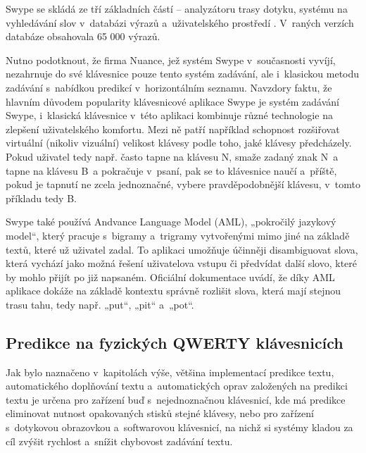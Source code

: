 \documentclass[a4paper,11pt,openany]{book} %
\begin{document}
Swype se skládá ze tří základních částí -- analyzátoru trasy dotyku, systému na vyhledávání slov v~databázi výrazů a~uživatelského prostředí \parencite{kushler2006system}. V~raných verzích databáze obsahovala 65 000 výrazů. \parencite{rafeneedleman2008} %

Nutno podotknout, že firma Nuance, jež systém Swype v~současnosti vyvíjí, nezahrnuje do své klávesnice pouze tento systém zadávání, ale i~klasickou metodu zadávání s~nabídkou predikcí v~horizontálním seznamu. Navzdory faktu, že hlavním důvodem popularity klávesnicové aplikace Swype je systém zadávání Swype, i~klasická klávesnice v~této aplikaci kombinuje různé technologie na zlepšení uživatelského komfortu. Mezi ně patří například schopnost rozšiřovat virtuální (nikoliv vizuální) velikost klávesy podle toho, jaké klávesy předcházely. Pokud uživatel tedy např. často tapne na klávesu N, smaže zadaný znak N~a tapne na klávesu B~a pokračuje v~psaní, pak se to klávesnice naučí a~příště, pokud je tapnutí ne zcela jednoznačné, vybere pravděpodobnější klávesu, v~tomto příkladu tedy B. \parencite{swypeabout} %


Swype také používá Andvance Language Model (AML), „pokročilý jazykový model“, který pracuje s~bigramy a~trigramy vytvořenými mimo jiné na základě textů, které už uživatel zadal. To aplikaci umožňuje účinněji disambiguovat slova, která vychází jako možná řešení uživatelova vstupu či předvídat další slovo, které by mohlo přijít po již napsaném. Oficiální dokumentace uvádí, že díky AML aplikace dokáže na základě kontextu správně rozlišit slova, která mají stejnou trasu tahu, tedy např. „put“, „pit“ a~„pot“. \parencite{swypehowto}

\subsection{Predikce na fyzických QWERTY klávesnicích}

Jak bylo naznačeno v~kapitolách výše, většina implementací predikce textu, automatického doplňování textu a~automatických oprav založených na predikci textu je určena pro zařízení buď s~nejednoznačnou klávesnicí, kde má predikce eliminovat nutnost opakovaných stisků stejné klávesy, nebo pro zařízení s~dotykovou obrazovkou a~softwarovou klávesnicí, na nichž si systémy kladou za cíl zvýšit rychlost a~snížit chybovost zadávání textu. 
\end{document}
